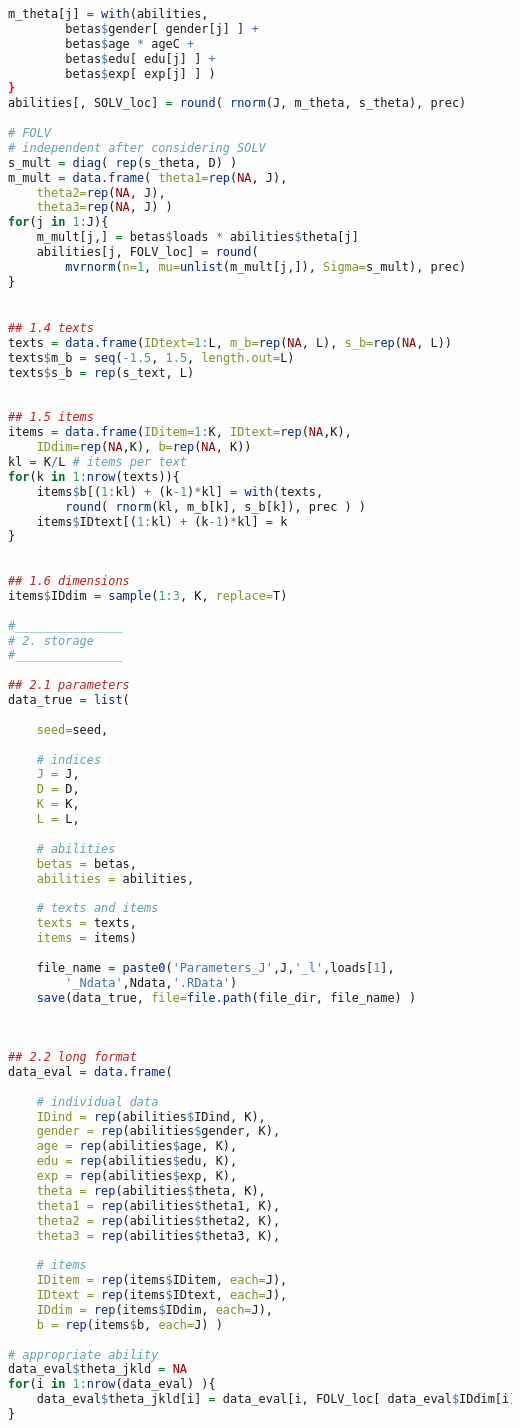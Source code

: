 \begin{lstlisting}[language=R]
	m_theta[j] = with(abilities,
		betas$gender[ gender[j] ] + 
		betas$age * ageC +
		betas$edu[ edu[j] ] + 
		betas$exp[ exp[j] ] )  
}
abilities[, SOLV_loc] = round( rnorm(J, m_theta, s_theta), prec)
		
# FOLV
# independent after considering SOLV
s_mult = diag( rep(s_theta, D) ) 
m_mult = data.frame( theta1=rep(NA, J), 
	theta2=rep(NA, J), 
	theta3=rep(NA, J) )
for(j in 1:J){
	m_mult[j,] = betas$loads * abilities$theta[j]
	abilities[j, FOLV_loc] = round( 
		mvrnorm(n=1, mu=unlist(m_mult[j,]), Sigma=s_mult), prec)
}
		

## 1.4 texts
texts = data.frame(IDtext=1:L, m_b=rep(NA, L), s_b=rep(NA, L))
texts$m_b = seq(-1.5, 1.5, length.out=L)
texts$s_b = rep(s_text, L)
		
		
## 1.5 items
items = data.frame(IDitem=1:K, IDtext=rep(NA,K), 
	IDdim=rep(NA,K), b=rep(NA, K))
kl = K/L # items per text
for(k in 1:nrow(texts)){
	items$b[(1:kl) + (k-1)*kl] = with(texts, 
		round( rnorm(kl, m_b[k], s_b[k]), prec ) )
	items$IDtext[(1:kl) + (k-1)*kl] = k
}
		
		
## 1.6 dimensions
items$IDdim = sample(1:3, K, replace=T)
		
#_______________
# 2. storage
#_______________
		
## 2.1 parameters
data_true = list(
	
	seed=seed,
	
	# indices
	J = J,
	D = D, 
	K = K, 
	L = L,
		
	# abilities
	betas = betas,
	abilities = abilities,
		
	# texts and items
	texts = texts,
	items = items)
	
	file_name = paste0('Parameters_J',J,'_l',loads[1],
		'_Ndata',Ndata,'.RData')
	save(data_true, file=file.path(file_dir, file_name) )
		
		
		
## 2.2 long format
data_eval = data.frame(
		
	# individual data
	IDind = rep(abilities$IDind, K),
	gender = rep(abilities$gender, K),
	age = rep(abilities$age, K),
	edu = rep(abilities$edu, K),
	exp = rep(abilities$exp, K),
	theta = rep(abilities$theta, K),
	theta1 = rep(abilities$theta1, K),
	theta2 = rep(abilities$theta2, K),
	theta3 = rep(abilities$theta3, K),
		
	# items
	IDitem = rep(items$IDitem, each=J),
	IDtext = rep(items$IDtext, each=J),
	IDdim = rep(items$IDdim, each=J),
	b = rep(items$b, each=J) )
		
# appropriate ability
data_eval$theta_jkld = NA
for(i in 1:nrow(data_eval) ){
	data_eval$theta_jkld[i] = data_eval[i, FOLV_loc[ data_eval$IDdim[i] ] ]
}
		

\end{lstlisting}
